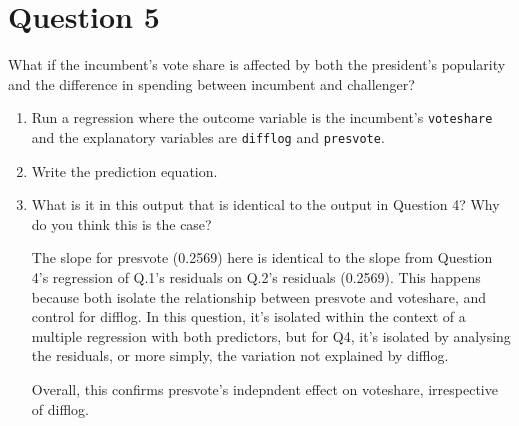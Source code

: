 \documentclass[12pt,letterpaper]{article}
\begin{document}
\section*{Question 5}
\noindent What if the incumbent's vote share is affected by both the president's popularity and the difference in spending between incumbent and challenger? 
	\begin{enumerate}
		\item Run a regression where the outcome variable is the incumbent's \texttt{voteshare} and the explanatory variables are \texttt{difflog} and \texttt{presvote}.	\vspace{1cm}
		
		  
		
		\vspace{1cm}
		
		
		\item Write the prediction equation.	\vspace{1cm}
		
		  
		
		\vspace{1cm}
		
		
		\item What is it in this output that is identical to the output in Question 4? Why do you think this is the case?
		
		\vspace{1cm}
		
		The slope for presvote (0.2569) here is identical to the slope from Question 4’s regression of Q.1's residuals on Q.2's residuals (0.2569). This happens because both isolate the relationship between presvote and voteshare, and control for difflog. In this question, it's isolated within the context of a multiple regression with both predictors, but for Q4, it's isolated by analysing the residuals, or more simply, the variation not explained by difflog. 
		
		 \vspace{1cm}
		 
		 Overall, this confirms presvote's indepndent effect on voteshare, irrespective of difflog.
		
		
	\end{enumerate}
\end{document}
